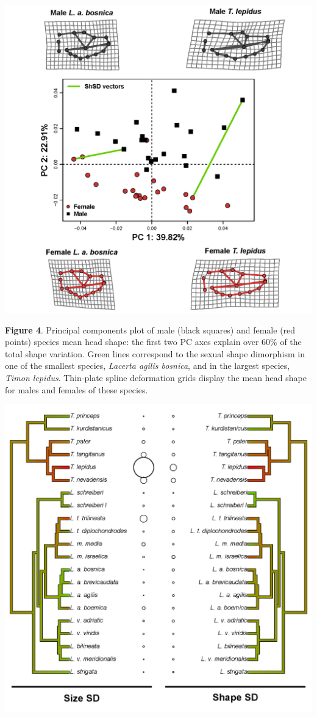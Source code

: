 \documentclass[]{article}
\begin{document}
\newpage

\includegraphics[width=0.95\linewidth]{Fig4}

\singlespacing \textbf{Figure 4}. Principal components plot of male
(black squares) and female (red points) species mean head shape: the
first two PC axes explain over 60\% of the total shape variation. Green
lines correspond to the sexual shape dimorphism in one of the smallest
species, \emph{Lacerta agilis bosnica}, and in the largest species,
\emph{Timon lepidus}. Thin-plate spline deformation grids display the
mean head shape for males and females of these species. \hfill\break

\newpage

\includegraphics[width=0.95\linewidth]{Fig5}
\end{document}
